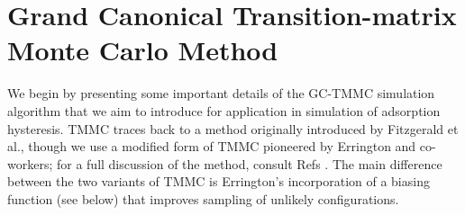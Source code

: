 \section{Grand Canonical Transition-matrix Monte Carlo Method}\label{sec:methodology}

We begin by presenting some important details of the GC-TMMC simulation algorithm that we aim to introduce for application in simulation of adsorption hysteresis.
TMMC traces back to a method originally introduced by Fitzgerald et al.\cite{Fitzgerald_Canonical_1999,Fitzgerald_Monte_2000}, though we use a modified form of TMMC pioneered by Errington and co-workers; for a full discussion of the method, consult Refs .
The main difference between the two variants of TMMC is Errington's incorporation of a biasing function (see below) that improves sampling of unlikely configurations.

